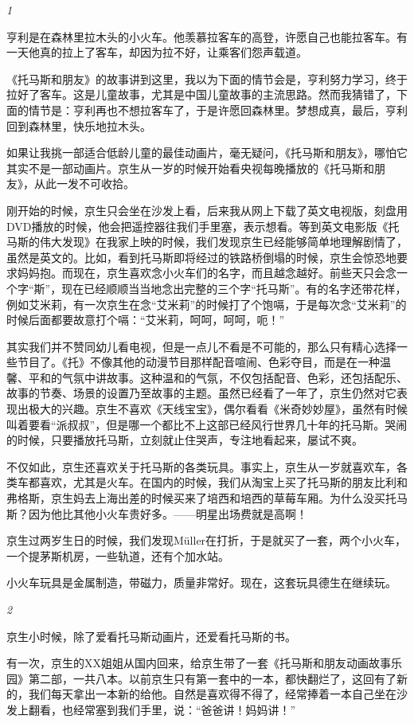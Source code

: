 \documentclass[twoside,openright,headings=optiontohead]{ctexbook} %
\begin{document}
{\emph{1}

亨利是在森林里拉木头的小火车。他羡慕拉客车的高登，许愿自己也能拉客车。有一天他真的拉上了客车，却因为拉不好，让乘客们怨声载道。

《托马斯和朋友》的故事讲到这里，我以为下面的情节会是，亨利努力学习，终于拉好了客车。这是儿童故事，尤其是中国儿童故事的主流思路。然而我猜错了，下面的情节是：亨利再也不想拉客车了，于是许愿回森林里。梦想成真，最后，亨利回到森林里，快乐地拉木头。

如果让我挑一部适合低龄儿童的最佳动画片，毫无疑问，《托马斯和朋友》，哪怕它其实不是一部动画片。京生从一岁的时候开始看央视每晚播放的《托马斯和朋友》，从此一发不可收拾。

刚开始的时候，京生只会坐在沙发上看，后来我从网上下载了英文电视版，刻盘用DVD播放的时候，他会把遥控器往我们手里塞，表示想看。等到英文电影版《托马斯的伟大发现》在我家上映的时候，我们发现京生已经能够简单地理解剧情了，虽然是英文的。比如，看到托马斯即将经过的铁路桥倒塌的时候，京生会惊恐地要求妈妈抱。而现在，京生喜欢念小火车们的名字，而且越念越好。前些天只会念一个字``斯''，现在已经顺顺当当地念出完整的三个字``托马斯''。有的名字还带花样，例如艾米莉，有一次京生在念``艾米莉''的时候打了个饱嗝，于是每次念``艾米莉''的时候后面都要故意打个嗝：``艾米莉，呵呵，呵呵，呃！''

其实我们并不赞同幼儿看电视，但是一点儿不看是不可能的，那么只有精心选择一些节目了。《托》不像其他的动漫节目那样配音喧闹、色彩夺目，而是在一种温馨、平和的气氛中讲故事。这种温和的气氛，不仅包括配音、色彩，还包括配乐、故事的节奏、场景的设置乃至故事的主题。虽然已经看了一年了，京生仍然对它表现出极大的兴趣。京生不喜欢《天线宝宝》，偶尔看看《米奇妙妙屋》，虽然有时候叫着要看``派叔叔''，但是哪一个都比不上这部已经风行世界几十年的托马斯。哭闹的时候，只要播放托马斯，立刻就止住哭声，专注地看起来，屡试不爽。

不仅如此，京生还喜欢关于托马斯的各类玩具。事实上，京生从一岁就喜欢车，各类车都喜欢，尤其是火车。在国内的时候，我们从淘宝上买了托马斯的朋友比利和弗格斯，京生妈去上海出差的时候买来了培西和培西的草莓车厢。为什么没买托马斯？因为他比其他小火车贵好多。------明星出场费就是高啊！

京生过两岁生日的时候，我们发现Müller在打折，于是就买了一套，两个小火车，一个提茅斯机房，一些轨道，还有个加水站。

小火车玩具是金属制造，带磁力，质量非常好。现在，这套玩具德生在继续玩。

\emph{2}

京生小时候，除了爱看托马斯动画片，还爱看托马斯的书。

有一次，京生的XX姐姐从国内回来，给京生带了一套《托马斯和朋友动画故事乐园》第二部，一共八本。以前京生只有第一套中的一本，都快翻烂了，这回有了新的，我们每天拿出一本新的给他。自然是喜欢得不得了，经常捧着一本自己坐在沙发上翻看，也经常塞到我们手里，说：``爸爸讲！妈妈讲！''

}
\end{document}
